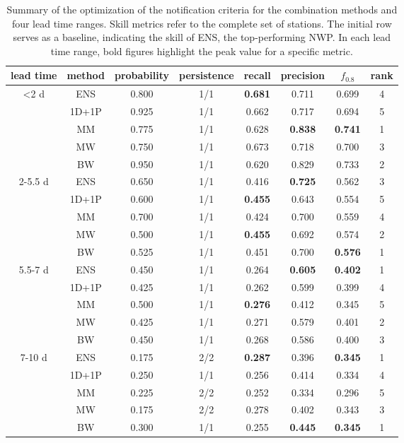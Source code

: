 \documentclass[preprint,12pt,authoryear]{elsarticle}
\begin{document}
\begin{table}
    \centering
    \caption{Summary of the optimization of the notification criteria for the combination methods and four lead time ranges. Skill metrics refer to the complete set of stations. The initial row serves as a baseline, indicating the skill of ENS, the top-performing NWP. In each lead time range, bold figures highlight the peak value for a specific metric. }
    \footnotesize
    \begin{tabular}{cccccccc}
        \toprule
        lead time & method & probability & persistence & recall & precision & $f_{0.8}$ & rank \\
        \midrule
        \textless 2 d& ENS & 0.800 & 1/1 & \textbf{0.681} & 0.711 & 0.699 & 4 \\
         & 1D+1P & 0.925 & 1/1 & 0.662 & 0.717 & 0.694 & 5 \\
         & MM & 0.775 & 1/1 & 0.628 & \textbf{0.838} & \textbf{0.741} & 1 \\
         & MW & 0.750 & 1/1 & 0.673 & 0.718 & 0.700 & 3 \\
         & BW & 0.950 & 1/1 & 0.620 & 0.829 & 0.733 & 2 \\
         \midrule
        2-5.5 d & ENS & 0.650 & 1/1 & 0.416 & \textbf{0.725} & 0.562 & 3 \\
         & 1D+1P & 0.600 & 1/1 & \textbf{0.455} & 0.643 & 0.554 & 5 \\
         & MM & 0.700 & 1/1 & 0.424 & 0.700 & 0.559 & 4 \\
         & MW & 0.500 & 1/1 & \textbf{0.455} & 0.692 & 0.574 & 2 \\
         & BW & 0.525 & 1/1 & 0.451 & 0.700 & \textbf{0.576} & 1 \\
         \midrule
        5.5-7 d & ENS & 0.450 & 1/1 & 0.264 & \textbf{0.605} & \textbf{0.402} & 1 \\
         & 1D+1P & 0.425 & 1/1 & 0.262 & 0.599 & 0.399 & 4 \\
         & MM & 0.500 & 1/1 & \textbf{0.276} & 0.412 & 0.345 & 5 \\
         & MW & 0.425 & 1/1 & 0.271 & 0.579 & 0.401 & 2 \\
         & BW & 0.450 & 1/1 & 0.268 & 0.586 & 0.400 & 3 \\
         \midrule
        7-10 d & ENS & 0.175 & 2/2 & \textbf{0.287} & 0.396 & \textbf{0.345} & 1 \\
         & 1D+1P & 0.250 & 1/1 & 0.256 & 0.414 & 0.334 & 4 \\
         & MM & 0.225 & 2/2 & 0.252 & 0.334 & 0.296 & 5 \\
         & MW & 0.175 & 2/2 & 0.278 & 0.402 & 0.343 & 3 \\
         & BW & 0.300 & 1/1 & 0.255 & \textbf{0.445} & \textbf{0.345} & 1 \\
         \bottomrule
    \end{tabular}
    \label{tab:COMB_optimization}
\end{table}
\end{document}
